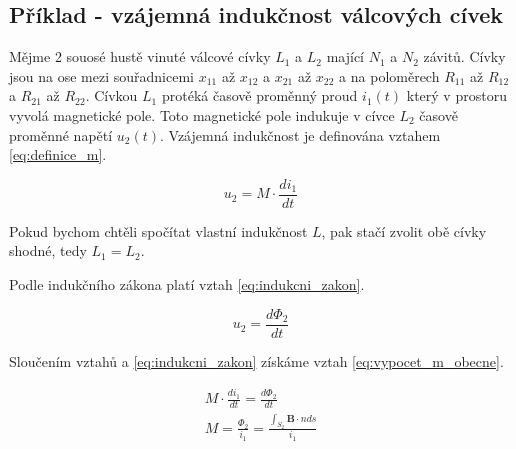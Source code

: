 \documentclass{book}
\newcommand{\vect}[1]{\boldsymbol{#1}}
\begin{document}
\subsection{Příklad - vzájemná indukčnost válcových cívek}

Mějme 2 souosé hustě vinuté válcové cívky \(L_1\) a \(L_2\) mající \(N_1\) a \(N_2\) závitů. Cívky jsou na ose mezi souřadnicemi \(x_{11}\) až \(x_{12}\) a \(x_{21}\) až \(x_{22}\) a na poloměrech \(R_{11}\) až \(R_{12}\) a \(R_{21}\) až \(R_{22}\). Cívkou \(L_1\) protéká časově proměnný proud \(i_1(t)\) který v prostoru vyvolá magnetické pole. Toto magnetické pole indukuje v cívce \(L_2\) časově proměnné napětí \(u_2(t)\). Vzájemná indukčnost je definována vztahem \eqref{eq:definice_m}.

\begin{equation}
\label{eq:definice_m}
u_2 = M \cdot \frac{di_1}{dt}
\end{equation}

Pokud bychom chtěli spočítat vlastní indukčnost \(L\), pak stačí zvolit obě cívky shodné, tedy \(L_1 = L_2\).



Podle indukčního zákona platí vztah \eqref{eq:indukcni_zakon}.

\begin{equation}
\label{eq:indukcni_zakon}
u_2 = \frac{d\Phi_2}{dt}
\end{equation}

Sloučením vztahů \label{eq:definice_m} a \eqref{eq:indukcni_zakon} získáme vztah \eqref{eq:vypocet_m_obecne}.

\begin{equation}
\label{eq:vypocet_m_obecne}
\begin{split}
M \cdot \frac{di_1}{dt} = \frac{d\Phi_2}{dt} \\
M = \frac{\Phi_2}{i_1} = \frac{\int_{S_2} \vect{B} \cdot {n} ds}{i_1}
\end{split}
\end{equation}
\end{document}
